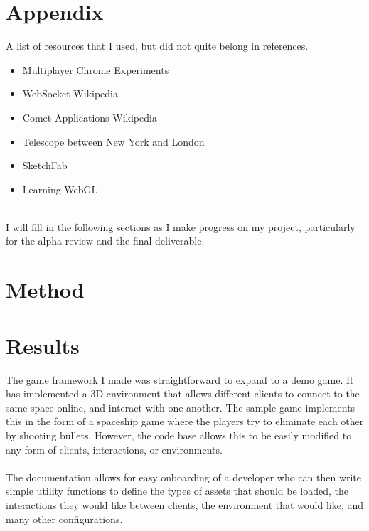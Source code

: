 \documentclass{acmsiggraph}
\begin{document}

\section{Appendix}
A list of resources that I used, but did not quite belong in references.
\begin{itemize}
    \item{Multiplayer Chrome Experiments}
    \item{WebSocket Wikipedia}
    \item{Comet Applications Wikipedia}
    \item{Telescope between New York and London}
    \item{SketchFab}
    \item{Learning WebGL}
\end{itemize}

\hrulefill \\
I will fill in the following sections as I make progress on my project, particularly for the alpha review and the final deliverable. %

\section{Method}

\section{Results}
    The game framework I made was straightforward to expand to a demo game. It has implemented a 3D environment that allows different clients to connect to the same space online, and interact with one another. The sample game implements this in the form of a spaceship game where the players try to eliminate each other by shooting bullets. However, the code base allows this to be easily modified to any form of clients, interactions, or environments. \\\\
    The documentation allows for easy onboarding of a developer who can then write simple utility functions to define the types of assets that should be loaded, the interactions they would like between clients, the environment that would like, and many other configurations.
\end{document}
